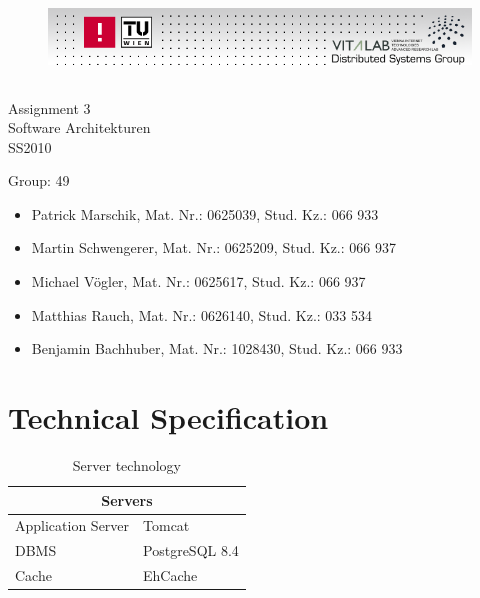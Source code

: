 \documentclass[11pt]{article}
\newcommand{\groupNr}{49}
\newcommand{\assignmentNr}{3}
\begin{document}
{	
	\begin{figure}[h]
	\hspace{-1cm}
	\includegraphics[height=23mm, width=170mm]{dsg-logo.png}
	\end{figure}

	\vspace{25mm}
	\centering
	{ \sffamily \Huge Assignment \assignmentNr } \\ \vspace{1mm}
	Software Architekturen \\ SS2010 \\ \vspace{10mm}
}

\noindent Group: \groupNr 
\begin{itemize}
\item Patrick Marschik, Mat. Nr.: 0625039, Stud. Kz.: 066 933 
\item Martin Schwengerer, Mat. Nr.: 0625209, Stud. Kz.: 066 937
\item Michael V\"ogler, Mat. Nr.: 0625617, Stud. Kz.: 066 937
\item Matthias Rauch, Mat. Nr.: 0626140, Stud. Kz.: 033 534
\item Benjamin Bachhuber, Mat. Nr.: 1028430, Stud. Kz.: 066 933 
\end{itemize}

\newpage
\tableofcontents

\newpage

\section{Technical Specification}

\begin{table}[h]
	\begin{tabularx}{\textwidth}{| X | X |}
	\hline
	\multicolumn{2}{|c|}{\textbf{Servers}} \\
	\hline
	\cellcolor[gray]{0.9}
	Application Server & Tomcat\\
	\hline
	\cellcolor[gray]{0.9}
	DBMS & PostgreSQL 8.4\\
	\hline
	\cellcolor[gray]{0.9}
	Cache & EhCache\\
	\hline
	\end{tabularx}
	\caption{Server technology}
	\label{server_tech}
\end{table}
\end{document}
